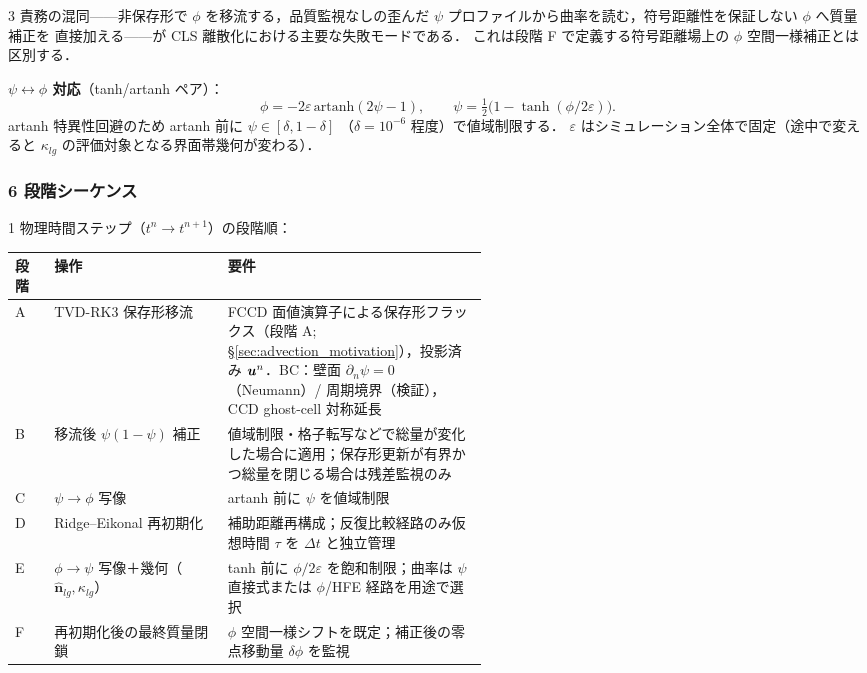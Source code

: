 3 責務の混同——非保存形で $\phi$ を移流する，品質監視なしの歪んだ
$\psi$ プロファイルから曲率を読む，符号距離性を保証しない $\phi$ へ質量補正を
直接加える——が CLS 離散化における主要な失敗モードである．
これは段階 F で定義する符号距離場上の $\phi$ 空間一様補正とは区別する．

\noindent\textbf{$\psi\leftrightarrow\phi$ 対応}（tanh/artanh ペア）：
\begin{equation}
  \phi = -2\varepsilon\,\mathrm{artanh}(2\psi-1),
  \qquad
  \psi = \tfrac{1}{2}\bigl(1 - \tanh(\phi/2\varepsilon)\bigr).
  \label{eq:cls_psi_phi_map}
\end{equation}
artanh 特異性回避のため artanh 前に $\psi\in[\delta,1-\delta]$
（$\delta=10^{-6}$ 程度）で値域制限する．
$\varepsilon$ はシミュレーション全体で固定（途中で変えると $\kappa_{lg}$ の評価対象となる界面帯幾何が変わる）．

\subsubsection{6 段階シーケンス}
\label{sec:cls_stage_sequence}

1 物理時間ステップ（$t^n\to t^{n+1}$）の段階順：

\begin{center}
\begin{tabular}{@{}llp{0.55\linewidth}@{}}
\hline
段階 & 操作 & 要件 \\
\hline
A & TVD-RK3 保存形移流 & FCCD 面値演算子による保存形フラックス（段階 A; \S\ref{sec:advection_motivation}），投影済み $\bm{u}^n$．BC：壁面 $\partial_n\psi=0$（Neumann）/ 周期境界（検証），CCD ghost-cell 対称延長 \\
B & 移流後 $\psi(1-\psi)$ 補正 & 値域制限・格子転写などで総量が変化した場合に適用；保存形更新が有界かつ総量を閉じる場合は残差監視のみ\\
C & $\psi\to\phi$ 写像 & artanh 前に $\psi$ を値域制限 \\
D & Ridge--Eikonal 再初期化 & 補助距離再構成；反復比較経路のみ仮想時間 $\tau$ を $\Delta t$ と独立管理 \\
E & $\phi\to\psi$ 写像＋幾何（$\hat{\bm n}_{lg},\kappa_{lg}$）& tanh 前に $\phi/2\varepsilon$ を飽和制限；曲率は $\psi$ 直接式または $\phi$/HFE 経路を用途で選択 \\
F & 再初期化後の最終質量閉鎖 & $\phi$ 空間一様シフトを既定；補正後の零点移動量 $\delta\phi$ を監視\\
\hline
\end{tabular}
\end{center}

